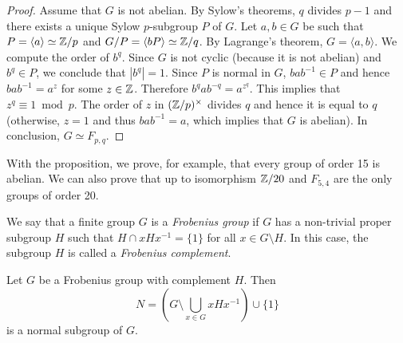 \begin{proof}
    Assume that $G$ is not abelian. By Sylow's theorems, 
    $q$ divides $p-1$ and there exists 
    a unique Sylow $p$-subgroup $P$ of $G$. Let $a,b\in G$ be such that 
    $P=\langle a\rangle\simeq\mathbb{Z}/p$ and $G/P=\langle bP\rangle\simeq\mathbb{Z}/q$. By Lagrange's theorem, 
    $G=\langle a,b\rangle$. We compute the order of $b^q$. Since 
    $G$ is not cyclic (because it is not abelian) and $b^q\in P$, 
    we conclude that $|b^q|=1$. 
    Since $P$ is normal in $G$, 
    $bab^{-1}\in P$ and hence $bab^{-1}=a^z$ for some $z\in\mathbb{Z}$. Therefore
    $b^qab^{-q}=a^{z^q}$. This implies that 
    $z^q\equiv1\bmod p$. The order of $z$ in $(\mathbb{Z}/p)^{\times}$ divides 
    $q$ and hence it is equal to $q$ (otherwise, $z=1$ and thus $bab^{-1}=a$, which implies
    that $G$ is abelian). In conclusion, 
    $G\simeq F_{p,q}$. 
\end{proof}

With the proposition, we prove, for example, that 
every group of order 15 is abelian. We can also prove
that up to isomorphism $\mathbb{Z}/20$ and  
$F_{5,4}$ are the only groups of order 20. 

\begin{definition}
  We say that a finite group $G$ is a 
  \emph{Frobenius group} if $G$ 
  has a non-trivial proper subgroup $H$ such that $H\cap
  xHx^{-1}=\{1\}$ for all $x\in G\setminus H$. In this case, the subgroup 
  $H$ is called a \emph{Frobenius complement}.
\end{definition}

\begin{theorem}[Frobenius]
  \label{thm:Frobenius}
  Let $G$ be a Frobenius group with complement $H$. Then
  \[
	N=\left( G\setminus\bigcup_{x\in G}xHx^{-1}\right)\cup\{1\}
  \]
  is a normal subgroup of $G$.
\end{theorem}


